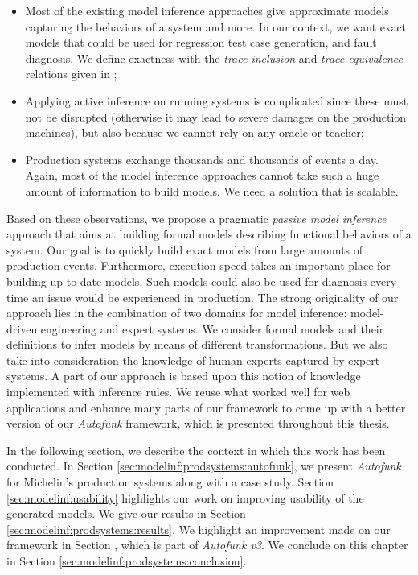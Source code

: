\begin{itemize}
    \item Most of the existing model inference approaches give
        approximate models capturing the behaviors of a system
        and more. In our context, we want exact models that could
        be used for regression test case generation, and fault
        diagnosis. We define exactness with the
        \emph{trace-inclusion} and \emph{trace-equivalence}
        relations given in \cite{petrenko06};

    \item Applying active inference on running systems is
        complicated since these must not be disrupted (otherwise
        it may lead to severe damages on the production
        machines), but also because we cannot rely on any oracle
        or teacher;

    \item Production systems exchange thousands and thousands of
        events a day. Again, most of the model inference
        approaches cannot take such a huge amount of information
        to build models. We need a solution that is scalable.
\end{itemize}

Based on these observations, we propose a pragmatic \emph{passive
model inference} approach that aims at building formal models
describing functional behaviors of a system. Our goal is to
quickly build exact models from large amounts of production
events.  Furthermore, execution speed takes an important place
for building up to date models. Such models could also be used
for diagnosis every time an issue would be experienced in
production.  The strong originality of our approach lies in the
combination of two domains for model inference: model-driven
engineering and expert systems. We consider formal models and
their definitions to infer models by means of different
transformations. But we also take into consideration the
knowledge of human experts captured by expert systems. A part of
our approach is based upon this notion of knowledge implemented
with inference rules. We reuse what worked well for web
applications and enhance many parts of our framework to come up
with a better version of our \textit{Autofunk} framework, which
is presented throughout this thesis.

In the following section, we describe the context in which this
work has been conducted. In Section
\ref{sec:modelinf:prodsystems:autofunk}, we present
\textit{Autofunk} for Michelin's production systems along with a
case study. Section \ref{sec:modelinf:usability} highlights our
work on improving usability of the generated models.  We give our
results in Section \ref{sec:modelinf:prodsystems:results}. We
highlight an improvement made on our framework in Section
\label{sec:modelinf:prodsystems:better-segmentation}, which is
part of \emph{Autofunk v3}. We conclude on this chapter in
Section \ref{sec:modelinf:prodsystems:conclusion}.

